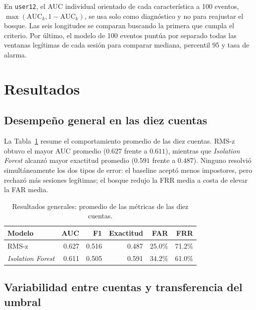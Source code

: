 \documentclass[11pt,letterpaper]{article}
\newcommand{\auc}{\mathrm{AUC}}
\begin{document}
En \texttt{user12}, el AUC individual orientado de cada característica a 100 eventos,
$\max(\auc_k,1-\auc_k)$, se usa solo como diagnóstico y no para reajustar el bosque. Las seis longitudes se comparan
buscando la primera que cumpla el criterio. Por último, el modelo de 100 eventos puntúa por separado todas las ventanas
legítimas de cada sesión para comparar mediana, percentil 95 y tasa de alarma.

\section{Resultados}

\subsection{Desempeño general en las diez cuentas}

La Tabla~\ref{tab:general} resume el comportamiento promedio de las diez cuentas. RMS-z obtuvo el mayor AUC promedio
($0.627$ frente a $0.611$), mientras que \emph{Isolation Forest} alcanzó mayor exactitud promedio ($0.591$ frente a
$0.487$). Ninguno resolvió simultáneamente los dos tipos de error: el baseline aceptó menos impostores, pero rechazó
más sesiones legítimas; el bosque redujo la FRR media a costa de elevar la FAR media.

\begin{table}[htbp]
  \centering
  \small
  \begin{tabular}{lrrrrr}
    \toprule
    Modelo & AUC & F1 & Exactitud & FAR & FRR \\
    \midrule
    RMS-z & 0.627 & 0.516 & 0.487 & 25.0\% & 71.2\% \\
    \emph{Isolation Forest} & 0.611 & 0.505 & 0.591 & 34.2\% & 61.0\% \\
    \bottomrule
  \end{tabular}
  \caption{Resultados generales: promedio de las métricas de las diez cuentas.}
  \label{tab:general}
\end{table}

\subsection{Variabilidad entre cuentas y transferencia del umbral}
\end{document}

